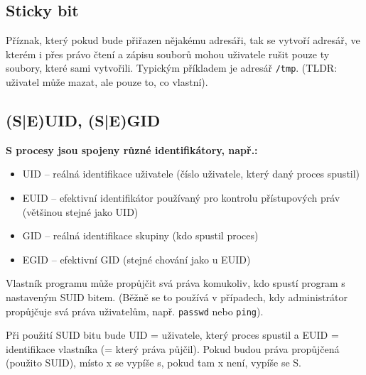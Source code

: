 \documentclass[a4paper, 11pt]{article}
\newcommand{\tcmd}[1]{\texttt{#1}}
\begin{document}
\subsection{Sticky bit}
Příznak, který pokud bude přiřazen nějakému adresáři, tak se vytvoří adresář, ve kterém i přes právo čtení a zápisu souborů mohou uživatele rušit pouze ty soubory, které sami vytvořili. Typickým příkladem je adresář \tcmd{/tmp}. (TLDR: uživatel může mazat, ale pouze to, co vlastní).

\newpage
\subsection{(S|E)UID, (S|E)GID} \label{seuid}
\textbf{S procesy jsou spojeny různé identifikátory, např.:}
\begin{itemize}
    \item UID -- reálná identifikace uživatele (číslo uživatele, který daný proces spustil)
    \item EUID -- efektivní identifikátor používaný pro kontrolu přístupových práv (většinou stejné jako UID)
    \item GID -- reálná identifikace skupiny (kdo spustil proces)
    \item EGID -- efektivní GID (stejné chování jako u EUID)
\end{itemize}
 
Vlastník programu může propůjčit svá práva komukoliv, kdo spustí program s nastaveným SUID bitem. (Běžně se to používá v případech, kdy administrátor propůjčuje svá práva uživatelům, např. \tcmd{passwd} nebo \tcmd{ping}).
 
Při použití SUID bitu bude UID = uživatele, který proces spustil a EUID = identifikace vlastníka (= který práva půjčil). Pokud budou práva propůjčená (použito SUID), místo x se vypíše s, pokud tam x není, vypíše se S.
\end{document}
